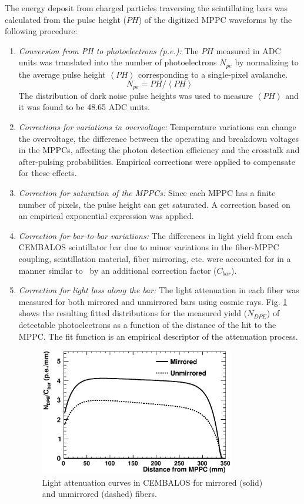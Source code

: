 The energy deposit from charged particles traversing the scintillating bars was calculated from the pulse height ($PH$) of the digitized MPPC waveforms by the following procedure:

\begin{enumerate}
\item {\it Conversion from PH to photoelectrons (p.e.):} The $PH$ measured in ADC units was translated into the number of photoelectrons $N_{pe}$ by normalizing to the average pulse height $\left\langle PH \right\rangle$ corresponding to a single-pixel avalanche. 
\begin{equation}
N_{pe} = PH/\left\langle PH \right\rangle
\end{equation}
The distribution of dark noise pulse heights was used to measure $\left\langle PH \right\rangle$ and it was found to be 48.65 ADC units. 
\item{\it Corrections for variations in overvoltage:} Temperature variations can change the overvoltage, the difference between the operating and breakdown voltages in the MPPCs, affecting the photon detection efficiency and the crosstalk and after-pulsing probabilities. Empirical corrections were applied to compensate for these effects.
\item{\it Correction for saturation of the MPPCs:} Since each MPPC has a finite number of pixels, the pulse height can get saturated. A correction based on an empirical exponential expression was applied.
\item{\it Correction for bar-to-bar variations:} The differences in light yield from each CEMBALOS scintillator bar due to minor variations in the fiber-MPPC coupling, scintillation material, fiber mirroring, etc. were accounted for in a manner similar to~\cite{fgd} by an additional correction factor ($C_{bar}$).
\item{\it Correction for light loss along the bar:} The light attenuation in each fiber was measured for both mirrored and unmirrored bars using cosmic rays. Fig. \ref{fig:attcurves} shows the resulting fitted distributions for the measured yield ($N_{DPE}$) of detectable photoelectrons as a function of the distance of the hit to the MPPC. The fit function is an empirical descriptor of the attenuation process.
\begin{figure}[!h]
\begin{center}
\includegraphics[width=85mm]{figures/attcurves_paper.eps}
\caption{Light attenuation curves in CEMBALOS for mirrored (solid) and unmirrored (dashed) fibers.}
\label{fig:attcurves}
\end{center} 
\end{figure}


\end{enumerate}
